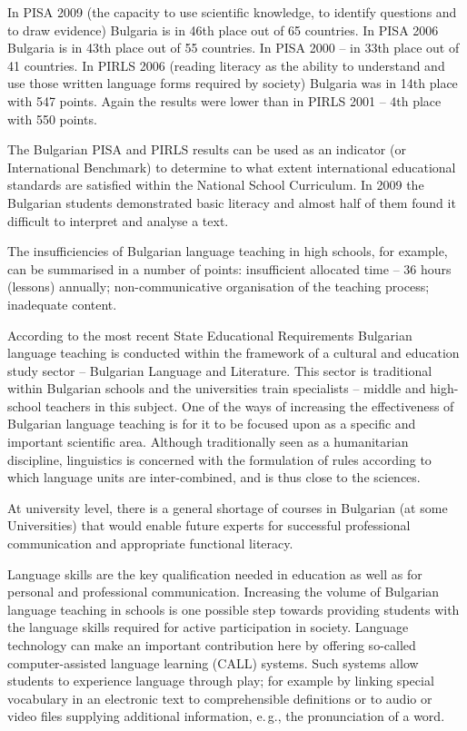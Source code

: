 \documentclass[]{../../metanetpaper}
\begin{document}
\begin{multicols}{2}
In PISA 2009 \cite{oecd} (the capacity to use scientific knowledge, to identify questions and to draw evidence) Bulgaria is in 46th place out of 65 countries. In PISA 2006 Bulgaria is in 43th place out of 55 countries. In PISA 2000 -- in 33th place out of 41 countries.  In PIRLS 2006 \cite{nces} (reading literacy as the ability to understand and use those written language forms required by society) Bulgaria was in 14th place with 547 points. Again the results were lower than in PIRLS 2001 -- 4th place with 550 points.

The Bulgarian PISA and PIRLS results can be used as an indicator (or International Benchmark) to determine to what extent international educational standards are satisfied within the National School Curriculum. In 2009 the Bulgarian students demonstrated basic literacy and almost half of them found it difficult to interpret and analyse a text. 

The insufficiencies of Bulgarian language teaching in high schools, for example, can be summarised in a number of points: insufficient allocated time – 36 hours (lessons) annually; non-communicative organisation of the teaching process; inadequate content.


According to the most recent State Educational Requirements Bulgarian language teaching is conducted within the framework of a cultural and education study sector -- Bulgarian Language and Literature. This sector is traditional within Bulgarian schools and the universities train specialists -- middle and high-school teachers in this subject. One of the ways of increasing the effectiveness of Bulgarian language teaching is for it to be focused upon as a specific and important scientific area. Although traditionally seen as a humanitarian discipline, linguistics is concerned with the formulation of rules according to which language units are inter-combined, and is thus close to the sciences. 

At university level, there is a general shortage of courses in Bulgarian (at some Universities) that would enable future experts for successful professional communication and appropriate functional literacy.

Language skills are the key qualification needed in education as well as for personal and professional communication. Increasing the volume of Bulgarian language teaching in schools is one possible step towards providing students with the language skills required for active participation in society. Language technology can make an important contribution here by offering so-called computer-assisted language learning (CALL) systems. Such systems allow students to experience language through play; for example by linking special vocabulary in an electronic text to comprehensible definitions or to audio or video files supplying additional information, e.\,g., the pronunciation of a word. 


\end{multicols}
\end{document}
